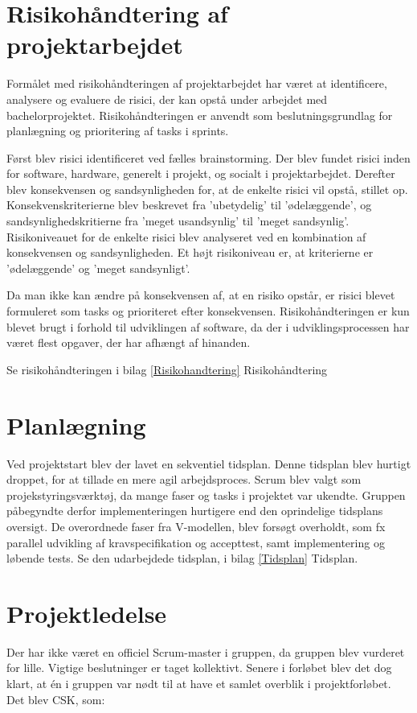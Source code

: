 \section{Risikohåndtering af projektarbejdet}
Formålet med risikohåndteringen af projektarbejdet har været at identificere, analysere og evaluere de risici, der kan opstå under arbejdet med bachelorprojektet. Risikohåndteringen er anvendt som beslutningsgrundlag for planlægning og prioritering af tasks i sprints. 

Først blev risici identificeret ved fælles brainstorming. Der blev fundet risici inden for software, hardware, generelt i projekt, og socialt i projektarbejdet. Derefter blev konsekvensen og sandsynligheden for, at de enkelte risici vil opstå, stillet op. Konsekvenskriterierne blev beskrevet fra 'ubetydelig' til 'ødelæggende', og sandsynlighedskritierne fra 'meget usandsynlig' til 'meget sandsynlig'. Risikoniveauet for de enkelte risici blev analyseret ved en kombination af konsekvensen og sandsynligheden. Et højt risikoniveau er, at kriterierne er 'ødelæggende' og 'meget sandsynligt'.

Da man ikke kan ændre på konsekvensen af, at en risiko opstår, er risici blevet formuleret som tasks og prioriteret efter konsekvensen. Risikohåndteringen er kun blevet brugt i forhold til udviklingen af software, da der i udviklingsprocessen har været flest opgaver, der har afhængt af hinanden.

Se risikohåndteringen i bilag \ref{Risikohandtering} Risikohåndtering

\section{Planlægning}
Ved projektstart blev der lavet en sekventiel tidsplan. Denne tidsplan blev hurtigt droppet, for at tillade en mere agil arbejdsproces. Scrum blev valgt som projekstyringsværktøj, da mange faser og tasks i projektet var ukendte. Gruppen påbegyndte derfor implementeringen hurtigere end den oprindelige tidsplans oversigt. De overordnede faser fra V-modellen, blev forsøgt overholdt, som fx parallel udvikling af kravspecifikation og accepttest, samt implementering og løbende tests. Se den udarbejdede tidsplan, i bilag \ref{Tidsplan} Tidsplan.

\section{Projektledelse}
Der har ikke været en officiel Scrum-master i gruppen, da gruppen blev vurderet for lille. Vigtige beslutninger er taget kollektivt. Senere i forløbet blev det dog klart, at én i gruppen var nødt til at have et samlet overblik i projektforløbet. Det blev CSK, som: 

